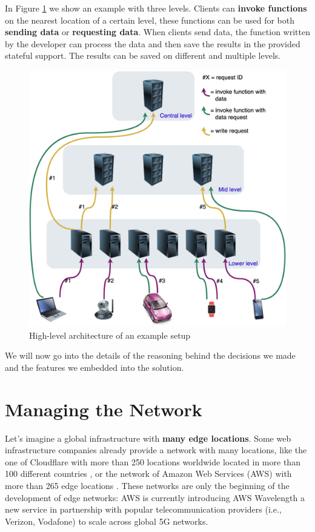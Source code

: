 In Figure \ref{fig:/high-level-architecture} we show an example with three levels. Clients can \textbf{invoke functions} on the nearest location of a certain level, these functions can be used for both \textbf{sending data} or \textbf{requesting data}. When clients send data, the function written by the developer can process the data and then save the results in the provided stateful support. The results can be saved on different and multiple levels.
\begin{figure}[H]
    \centering
    \includegraphics[width=0.90\linewidth]{Figures/Solution/high-level-architecture.png}
    \caption{High-level architecture of an example setup}
    \label{fig:/high-level-architecture}
\end{figure}

We will now go into the details of the reasoning behind the decisions we made and the features we embedded into the solution.


\section{Managing the Network}
Let’s imagine a global infrastructure with \textbf{many edge locations}. Some web infrastructure companies already provide a network with many locations, like the one of Cloudflare with more than 250 locations worldwide located in more than 100 different countries \cite{cloudflare-network}, or the network of Amazon Web Services (AWS) with more than 265 edge locations \cite{aws-network}.
These networks are only the beginning of the development of edge networks: AWS is currently introducing AWS Wavelength \cite{aws-wavelength} a new service in partnership with popular telecommunication providers (i.e., Verizon, Vodafone) to scale across global 5G networks.


